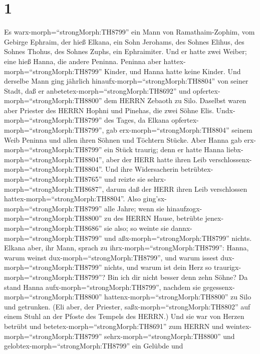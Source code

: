 \hypertarget{section}{%
\section{1}\label{section}}

 Es warx-morph=``strongMorph:TH8799'' ein Mann von
Ramathaim-Zophim, vom Gebirge Ephraim, der hieß Elkana, ein Sohn
Jerohams, des Sohnes Elihus, des Sohnes Thohus, des Sohnes Zuphs, ein
Ephraimiter.  Und er hatte zwei Weiber; eine hieß Hanna, die
andere Peninna. Peninna aber hattex-morph=``strongMorph:TH8799'' Kinder,
und Hanna hatte keine Kinder.  Und derselbe Mann ging
jährlich hinaufx-morph=``strongMorph:TH8804'' von seiner Stadt, daß er
anbetetex-morph=``strongMorph:TH8692'' und
opfertex-morph=``strongMorph:TH8800'' dem HERRN Zebaoth zu Silo.
Daselbst waren aber Priester des HERRN Hophni und Pinehas, die zwei
Söhne Elis.  Undx-morph=``strongMorph:TH8799'' des Tages, da
Elkana opfertex-morph=``strongMorph:TH8799'', gab
erx-morph=``strongMorph:TH8804'' seinem Weib Peninna und allen ihren
Söhnen und Töchtern Stücke.  Aber Hanna gab
erx-morph=``strongMorph:TH8799'' ein Stück traurig; denn er hatte Hanna
liebx-morph=``strongMorph:TH8804'', aber der HERR hatte ihren Leib
verschlossenx-morph=``strongMorph:TH8804''.  Und ihre
Widersacherin betrübtex-morph=``strongMorph:TH8765'' und reizte sie
sehrx-morph=``strongMorph:TH8687'', darum daß der HERR ihren Leib
verschlossen hattex-morph=``strongMorph:TH8804''.  Also
ging'sx-morph=``strongMorph:TH8799'' alle Jahre; wenn sie
hinaufzogx-morph=``strongMorph:TH8800'' zu des HERRN Hause, betrübte
jenex-morph=``strongMorph:TH8686'' sie also; so weinte sie
dannx-morph=``strongMorph:TH8799'' und aßx-morph=``strongMorph:TH8799''
nichts.  Elkana aber, ihr Mann, sprach zu
ihrx-morph=``strongMorph:TH8799'': Hanna, warum weinst
dux-morph=``strongMorph:TH8799'', und warum issest
dux-morph=``strongMorph:TH8799'' nichts, und warum ist dein Herz so
traurigx-morph=``strongMorph:TH8799''? Bin ich dir nicht besser denn
zehn Söhne?  Da stand Hanna
aufx-morph=``strongMorph:TH8799'', nachdem sie
gegessenx-morph=``strongMorph:TH8800''
hattenx-morph=``strongMorph:TH8800'' zu Silo und getrunken. (Eli aber,
der Priester, saßx-morph=``strongMorph:TH8802'' auf einem Stuhl an der
Pfoste des Tempels des HERRN.)  Und sie war von Herzen
betrübt und betetex-morph=``strongMorph:TH8691'' zum HERRN und
weintex-morph=``strongMorph:TH8799'' sehrx-morph=``strongMorph:TH8800''
 und gelobtex-morph=``strongMorph:TH8799'' ein Gelübde und
